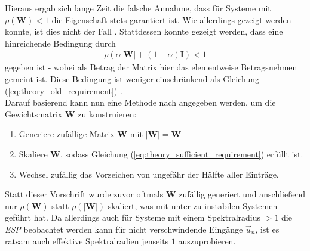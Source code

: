 Hieraus ergab sich lange Zeit die falsche Annahme, dass für Systeme mit $\rho(\mathbf{W}) < 1$ die Eigenschaft stets garantiert ist. Wie allerdings gezeigt werden konnte, ist dies nicht der Fall \citep{yildiz}. Stattdessen konnte gezeigt werden, dass eine hinreichende Bedingung durch
\begin{align}
\label{eq:theory_sufficient_requirement}
\rho(\alpha |\mathbf{W}|+(1-\alpha) \mathbf{I}) < 1
\end{align}
gegeben ist - wobei als Betrag der Matrix hier das elementweise Betragsnehmen gemeint ist. Diese Bedingung ist weniger einschränkend als Gleichung (\ref{eq:theory_old_requirement}) \cite{yildiz}.\\

Darauf basierend kann nun eine Methode nach \cite{yildiz} angegeben werden, um die Gewichtsmatrix $\mathbf{W}$ zu konstruieren:

\singlespacing
\begin{enumerate}
	\item Generiere zufällige Matrix $\mathbf{W}$ mit $\mathbf{|W|} = \mathbf{W}$
	\item Skaliere $\mathbf{W}$, sodass Gleichung (\ref{eq:theory_sufficient_requirement}) erfüllt ist.
	\item Wechsel zufällig das Vorzeichen von ungefähr der Hälfte aller Einträge.
\end{enumerate}
\onehalfspacing

Statt dieser Vorschrift wurde zuvor oftmals $\mathbf{W}$ zufällig generiert und anschließend nur $\rho(\mathbf{W})$ statt $\rho(|\mathbf{W}|)$ skaliert, was mit unter zu instabilen Systemen geführt hat. Da allerdings auch für Systeme mit einem Spektralradius $ > 1$ die \textit{ESP} beobachtet werden kann für nicht verschwindende Eingänge $\vec{u}_n$, ist es ratsam auch effektive Spektralradien jenseits $1$ auszuprobieren.